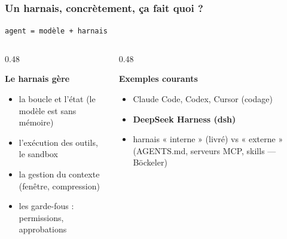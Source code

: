 \documentclass[
	11pt,
	aspectratio=169
]{beamer}
\begin{document}
\begin{frame}
    \frametitle{Un harnais, concrètement, ça fait quoi ?}
    \begin{center}
        {\large \texttt{agent = modèle + harnais}}
    \end{center}
    \bigskip
    \begin{columns}[t]
        \begin{column}{0.48\textwidth}
            \begin{block}{\centering \textbf{Le harnais gère}}
                \begin{itemize}\setlength\itemsep{0.3em}
                    \item la boucle et l'état (le modèle est sans mémoire)
                    \item l'exécution des outils, le sandbox
                    \item la gestion du contexte (fenêtre, compression)
                    \item les garde-fous : permissions, approbations
                \end{itemize}
            \end{block}
        \end{column}
        \begin{column}{0.48\textwidth}
            \begin{exampleblock}{\centering \textbf{Exemples courants}}
                \begin{itemize}\setlength\itemsep{0.3em}
                    \item Claude Code, Codex, Cursor (codage)
                    \item \textbf{DeepSeek Harness (dsh)}
                    \item harnais « interne » (livré) vs « externe » (AGENTS.md, serveurs MCP, skills --- Böckeler)
                \end{itemize}
            \end{exampleblock}
        \end{column}
    \end{columns}
\end{frame}
\end{document}
